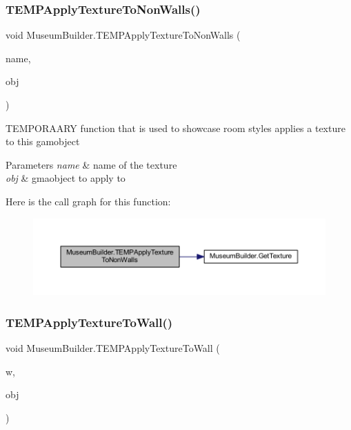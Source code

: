 \subsubsection{\texorpdfstring{T\+E\+M\+P\+Apply\+Texture\+To\+Non\+Walls()}{TEMPApplyTextureToNonWalls()}}
{\footnotesize\ttfamily void Museum\+Builder.\+T\+E\+M\+P\+Apply\+Texture\+To\+Non\+Walls (\begin{DoxyParamCaption}\item[{string}]{name,  }\item[{Game\+Object}]{obj }\end{DoxyParamCaption})\hspace{0.3cm}{\ttfamily [private]}}



T\+E\+M\+P\+O\+R\+A\+A\+RY function that is used to showcase room styles applies a texture to this gamobject 


\begin{DoxyParams}{Parameters}
{\em name} & name of the texture\\
\hline
{\em obj} & gmaobject to apply to\\
\hline
\end{DoxyParams}
Here is the call graph for this function\+:
\nopagebreak
\begin{figure}[H]
\begin{center}
\leavevmode
\includegraphics[width=350pt]{class_museum_builder_a3e3b2909202167c6b1e5515317b3cb1e_cgraph}
\end{center}
\end{figure}
\mbox{\label{class_museum_builder_a892b18a8420e1e96ce712f65bc309068}} 
\subsubsection{\texorpdfstring{T\+E\+M\+P\+Apply\+Texture\+To\+Wall()}{TEMPApplyTextureToWall()}}
{\footnotesize\ttfamily void Museum\+Builder.\+T\+E\+M\+P\+Apply\+Texture\+To\+Wall (\begin{DoxyParamCaption}\item[{\mbox{\hyperlink{class_wall}{Wall}}}]{w,  }\item[{Game\+Object}]{obj }\end{DoxyParamCaption})\hspace{0.3cm}{\ttfamily [private]}}



